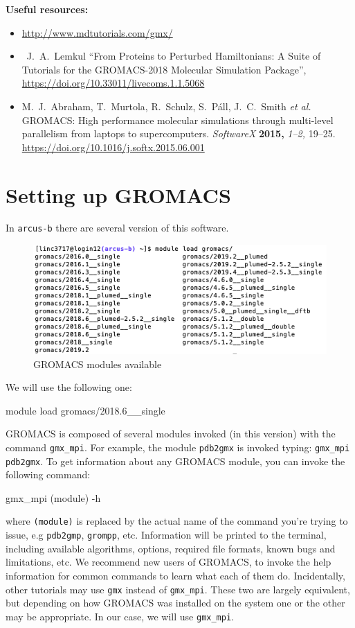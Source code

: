 \documentclass[10pt]{article}
\begin{document}
\textbf{Useful resources:}
\begin{itemize}
	 \item \url{http://www.mdtutorials.com/gmx/}
	\item\ J.\ A.\ Lemkul ``From Proteins to Perturbed Hamiltonians: A Suite of Tutorials for the GROMACS-2018 Molecular Simulation Package'', \url{https://doi.org/10.33011/livecoms.1.1.5068}
    \item M.\ J.\ Abraham, T.\ Murtola, R.\ Schulz, S.\ P\'{a}ll, J.\ C.\ Smith \textit{et al.} GROMACS: High performance molecular simulations through multi-level parallelism from laptops to supercomputers. \textit{SoftwareX} \textbf{2015,} \textit{1--2,} 19--25. \url{https://doi.org/10.1016/j.softx.2015.06.001} 
\end{itemize}

\section{Setting up GROMACS}
In \texttt{arcus-b} there are several version of this software. \begin{figure}[H]
 \centering
 \includegraphics[scale=0.5]{./img/gromacs}
 \caption{GROMACS modules available}
\end{figure}
We will use the following one:
\begin{cmdline}
module load gromacs/2018.6__single
\end{cmdline}

GROMACS is composed of several modules invoked (in this version) with the command \texttt{gmx\_mpi}. For example, the module \texttt{pdb2gmx} is invoked typing: \texttt{gmx\_mpi pdb2gmx}. To get information about any GROMACS module, you can invoke the following command:

\begin{cmdline}
gmx_mpi (module) -h
\end{cmdline}

where \texttt{(module)} is replaced by the actual name of the command you're trying to issue, e.g \texttt{pdb2gmp}, \texttt{grompp}, etc. Information will be printed to the terminal, including available algorithms, options, required file formats, known bugs and limitations, etc. We recommend new users of GROMACS, to invoke the help information for common commands to learn what each of them do. Incidentally, other tutorials may use \texttt{gmx} instead of \texttt{gmx\_mpi}. These two are largely equivalent, but depending on how GROMACS was installed on the system one or the other may be appropriate. In our case, we will use \texttt{gmx\_mpi}.
\end{document}
